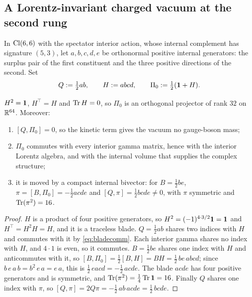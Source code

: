 \subsection{A Lorentz-invariant charged vacuum at the second rung}
\label{sec:towervac}

\begin{definition}
\label{def:towervac}
In $\mathrm{Cl}(6,6)$ with the spectator interior action, whose internal complement has signature $(5,3)$, let $a,b,c,d,e$ be orthonormal positive internal generators: the
surplus pair of the first constituent and the three positive directions of the second. Set
\[
Q:=\tfrac12ab,\qquad H:=abcd,\qquad \Pi_0:=\tfrac12(\mathbf 1+H).
\]
\end{definition}

\begin{theorem}
\label{thm:towervac}
$H^2=\mathbf 1$, $H^{\!\top}=H$ and $\operatorname{Tr} H=0$, so $\Pi_0$ is an orthogonal projector of rank $32$ on $\mathbb{R}^{64}$. Moreover:
\begin{enumerate}[label=(\roman*),leftmargin=2.2em]
\item $[Q,\Pi_0]=0$, so the kinetic term gives the vacuum no gauge-boson mass;
\item $\Pi_0$ commutes with every interior gamma matrix, hence with the interior Lorentz algebra, and with the internal volume that supplies the complex structure;
\item it is moved by a compact internal bivector: for $B=\tfrac12be$, $\pi=[B,\Pi_0]=-\tfrac12acde$ and $[Q,\pi]=\tfrac12bcde\neq0$, with $\pi$ symmetric and $\operatorname{Tr}(\pi^2)=16$.
\end{enumerate}
\end{theorem}

\begin{proof}
$H$ is a product of four positive generators, so $H^2=(-1)^{4\cdot3/2}\mathbf 1=\mathbf 1$ and $H^{\!\top}=H^2H=H$, and it is a traceless blade. $Q=\tfrac12ab$ shares two indices with
$H$ and commutes with it by \eqref{eq:bladecomm}. Each interior gamma shares no index with $H$, and $4\cdot1$ is even, so it commutes. $B=\tfrac12be$ shares one index with
$H$ and anticommutes with it, so $[B,\Pi_0]=\tfrac12[B,H]=BH=\tfrac12\,be\,abcd$; since $b\,e\,a\,b=b^2\,e\,a=e\,a$, this is $\tfrac12\,eacd=-\tfrac12\,acde$. The
blade $acde$ has four positive generators and is symmetric, and $\operatorname{Tr}(\pi^2)=\tfrac14\operatorname{Tr}\mathbf 1=16$. Finally $Q$ shares one index with $\pi$, so
$[Q,\pi]=2Q\pi=-\tfrac12\,ab\,acde=\tfrac12\,bcde$.
\end{proof}


